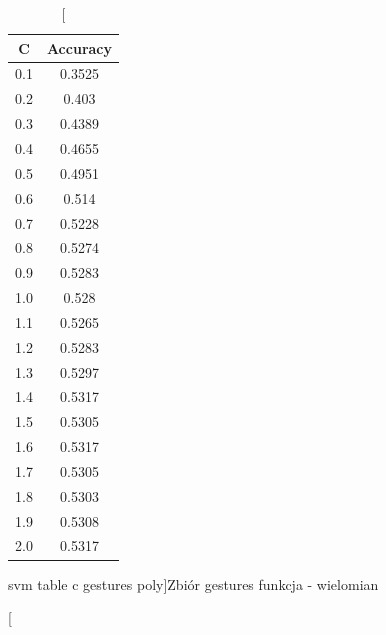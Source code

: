 \documentclass{classrep}
\begin{document}
{{            \begin{table}[!htbp]
                \begin{minipage}{.35\textwidth}
                    \centering
                    \begin{tabular}{|c|c|}
                        \hline
                        C & Accuracy \\ \hline
                        0.1 & 0.3525 \\ \hline
                        0.2 & 0.403 \\ \hline
                        0.3 & 0.4389 \\ \hline
                        0.4 & 0.4655 \\ \hline
                        0.5 & 0.4951 \\ \hline
                        0.6 & 0.514 \\ \hline
                        0.7 & 0.5228 \\ \hline
                        0.8 & 0.5274 \\ \hline
                        0.9 & 0.5283 \\ \hline
                        1.0 & 0.528 \\ \hline
                        1.1 & 0.5265 \\ \hline
                        1.2 & 0.5283 \\ \hline
                        1.3 & 0.5297 \\ \hline
                        1.4 & 0.5317 \\ \hline
                        1.5 & 0.5305 \\ \hline
                        1.6 & 0.5317 \\ \hline
                        1.7 & 0.5305 \\ \hline
                        1.8 & 0.5303 \\ \hline
                        1.9 & 0.5308 \\ \hline
                        2.0 & 0.5317 \\ \hline
                    \end{tabular}
                    \caption
                    [svm table c gestures poly]{Zbiór gestures funkcja - wielomian}
                    \label{svm_table_c_gestures_poly}
                \end{minipage}
                \hfill
                \begin{minipage}{.3\textwidth}
                    \centering
                    \begin{tabular}{|c|c|}

\end{tabular}
\end{minipage}
\end{table}}}
\end{document}
